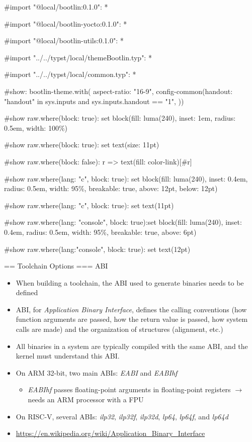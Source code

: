 #import "@local/bootlin:0.1.0": *

#import "@local/bootlin-yocto:0.1.0": *

#import "@local/bootlin-utils:0.1.0": *

#import "../../typst/local/themeBootlin.typ": *

#import "../../typst/local/common.typ": *

#show: bootlin-theme.with( aspect-ratio: "16-9", config-common(handout: "handout" in sys.inputs and sys.inputs.handout == "1", ))

#show raw.where(block: true): set block(fill: luma(240), inset: 1em, radius: 0.5em, width: 100\%)

#show raw.where(block: true): set text(size: 11pt)

#show raw.where(block: false): r => text(fill: color-link)[#r]

#show raw.where(lang: "c", block: true): set block(fill: luma(240), inset: 0.4em, radius: 0.5em, width: 95\%, breakable: true, above: 12pt, below: 12pt)

#show raw.where(lang: "c", block: true): set text(11pt)

#show raw.where(lang: "console", block: true):set block(fill: luma(240), inset: 0.4em, radius: 0.5em, width: 95\%, breakable: true, above: 6pt)

#show raw.where(lang:"console", block: true): set text(12pt)

 == Toolchain Options
=== ABI
  \begin{itemize}
  \item When building a toolchain, the ABI used to generate binaries
    needs to be defined
  \item ABI, for {\em Application Binary Interface}, defines the
    calling conventions (how function arguments are passed, how the
    return value is passed, how system calls are made) and the
    organization of structures (alignment, etc.)
  \item All binaries in a system are typically compiled with the same ABI,
    and the kernel must understand this ABI.
  \item On ARM 32-bit, two main ABIs: {\em EABI} and {\em EABIhf}
    \begin{itemize}
    \item {\em EABIhf} passes floating-point arguments in
      floating-point registers $\rightarrow$ needs an ARM processor
      with a FPU
    \end{itemize}
  \item On RISC-V, several ABIs: {\em ilp32}, {\em ilp32f}, {\em ilp32d},
        {\em lp64}, {\em lp64f}, and {\em lp64d}
  \item {\fontsize{10}{15} \url{https://en.wikipedia.org/wiki/Application_Binary_Interface}}
  \end{itemize}


